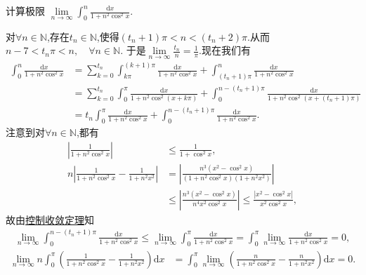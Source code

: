 \documentclass[../../main.tex]{subfiles}
\begin{document}
\begin{example}
计算极限 $\lim\limits_{n \to \infty} \int_{0}^{n} \frac{\mathrm{d}x}{1 + n^2 \cos^2 x}$.
\end{example}
\begin{solution}
对$\forall n\in \mathbb{N}$,存在$t_n\in \mathbb{N}$,使得$\left( t_n+1 \right) \pi <n<\left( t_n+2 \right) \pi$.从而
$n-7<t_n\pi <n,\quad \forall n\in \mathbb{N}$.
于是$\lim\limits_{n\rightarrow \infty}\frac{t_n}{n}=\frac{1}{\pi}$.现在我们有
\begin{align}
\int_0^n{\frac{\mathrm{d}x}{1+n^2\cos ^2x}}&=\sum_{k=0}^{t_n}{\int_{k\pi}^{\left( k+1 \right) \pi}{\frac{\mathrm{d}x}{1+n^2\cos ^2x}}}+\int_{\left( t_n+1 \right) \pi}^n{\frac{\mathrm{d}x}{1+n^2\cos ^2x}} \nonumber \\
&=\sum_{k=0}^{t_n}{\int_0^{\pi}{\frac{\mathrm{d}x}{1+n^2\cos ^2\left( x+k\pi \right)}}}+\int_0^{n-\left( t_n+1 \right) \pi}{\frac{\mathrm{d}x}{1+n^2\cos ^2\left( x+\left( t_n+1 \right) \pi \right)}} \nonumber \\
&=t_n\int_0^{\pi}{\frac{\mathrm{d}x}{1+n^2\cos ^2x}}+\int_0^{n-\left( t_n+1 \right) \pi}{\frac{\mathrm{d}x}{1+n^2\cos ^2x}}. \label{eq:177.12}
\end{align}
注意到对$\forall n\in \mathbb{N}$,都有
\begin{align*}
\left| \frac{1}{1+n^2\cos ^2x} \right|&\leqslant \frac{1}{1+\cos ^2x}, \\
n\left| \frac{1}{1+n^2\cos ^2x}-\frac{1}{1+n^2x^2} \right|&=\left| \frac{n^3\left( x^2-\cos ^2x \right)}{\left( 1+n^2\cos ^2x \right) \left( 1+n^2x^2 \right)} \right| \\
&\leqslant \left| \frac{n^3\left( x^2-\cos ^2x \right)}{n^4x^2\cos ^2x} \right|\leqslant \frac{\left| x^2-\cos ^2x \right|}{x^2\cos ^2x},
\end{align*}
故由\hyperref[Real Analysis-theorem:控制收敛定理]{控制收敛定理}知
\begin{align}
\lim\limits_{n\rightarrow \infty}\int_0^{n-\left( t_n+1 \right) \pi}{\frac{\mathrm{d}x}{1+n^2\cos ^2x}}\leqslant \lim\limits_{n\rightarrow \infty}\int_0^{\pi}{\frac{\mathrm{d}x}{1+n^2\cos ^2x}}=\int_0^{\pi}{\lim\limits_{n\rightarrow \infty}\frac{\mathrm{d}x}{1+n^2\cos ^2x}}=0, \label{eq:177.13}
\end{align}
\begin{align*}
\lim\limits_{n\rightarrow \infty}n\int_0^{\pi}{\left( \frac{1}{1+n^2\cos ^2x}-\frac{1}{1+n^2x^2} \right) \mathrm{d}x}&=\int_0^{\pi}{\lim\limits_{n\rightarrow \infty}\left( \frac{n}{1+n^2\cos ^2x}-\frac{n}{1+n^2x^2} \right) \mathrm{d}x}=0.

\end{align*}
\end{solution}
\end{document}
